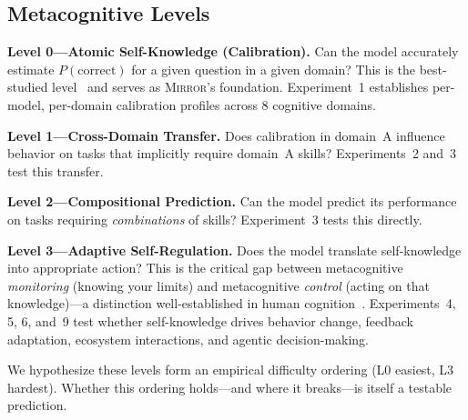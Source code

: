 \documentclass[10pt]{article}
\newcommand{\mirror}{\textsc{Mirror}}
\begin{document}
\subsection{Metacognitive Levels}

\textbf{Level 0---Atomic Self-Knowledge (Calibration).}
Can the model accurately estimate $P(\text{correct})$ for a given question in a
given domain? This is the best-studied level~\citep{kadavath2022language,
kapoor2024calibration} and serves as \mirror{}'s foundation. Experiment~1
establishes per-model, per-domain calibration profiles across 8 cognitive domains.

\textbf{Level 1---Cross-Domain Transfer.}
Does calibration in domain~A influence behavior on tasks that implicitly require
domain~A skills? Experiments~2 and~3 test this transfer.

\textbf{Level 2---Compositional Prediction.}
Can the model predict its performance on tasks requiring \textit{combinations} of
skills? Experiment~3 tests this directly.

\textbf{Level 3---Adaptive Self-Regulation.}
Does the model translate self-knowledge into appropriate action? This is the
critical gap between metacognitive \textit{monitoring} (knowing your limits) and
metacognitive \textit{control} (acting on that knowledge)---a distinction
well-established in human cognition~\citep{metcalfe2008metacognitive}.
Experiments~4, 5, 6, and~9 test whether self-knowledge drives behavior change,
feedback adaptation, ecosystem interactions, and agentic decision-making.

We hypothesize these levels form an empirical difficulty ordering (L0 easiest, L3
hardest). Whether this ordering holds---and where it breaks---is itself a testable
prediction.
\end{document}

